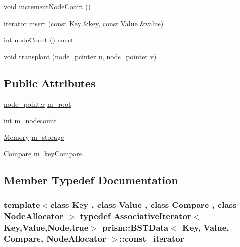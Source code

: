 \begin{DoxyCompactItemize}
void \hyperlink{structprism_1_1_b_s_t_data_a60dc1cbae77145e214a06009babfef4a}{increment\+Node\+Count} ()
\item 
\hyperlink{structprism_1_1_b_s_t_data_a45bbf30d426440d4c346529f898b840c}{iterator} \hyperlink{structprism_1_1_b_s_t_data_a791c56b40962b32cd4df9e30e6b95267}{insert} (const Key \&key, const Value \&value)
\item 
int \hyperlink{structprism_1_1_b_s_t_data_ae212f01cf0e019d0359b28e88d91d2d2}{node\+Count} () const 
\item 
void \hyperlink{structprism_1_1_b_s_t_data_a4f8fa8ab8515c3b77b7bbc02c60aef50}{transplant} (\hyperlink{structprism_1_1_b_s_t_node}{node\+\_\+pointer} u, \hyperlink{structprism_1_1_b_s_t_node}{node\+\_\+pointer} v)
\end{DoxyCompactItemize}
\subsection*{Public Attributes}
\begin{DoxyCompactItemize}
\item 
\hyperlink{structprism_1_1_b_s_t_node}{node\+\_\+pointer} \hyperlink{structprism_1_1_b_s_t_data_afb5f96097c1713e1d86b1c38d831d5fe}{m\+\_\+root}
\item 
int \hyperlink{structprism_1_1_b_s_t_data_a99e476b247ff0230b1ce077634e5b445}{m\+\_\+nodecount}
\item 
\hyperlink{structprism_1_1_b_s_t_memory}{Memory} \hyperlink{structprism_1_1_b_s_t_data_aa6f2a5e9475beddec8574677bb8ee997}{m\+\_\+storage}
\item 
Compare \hyperlink{structprism_1_1_b_s_t_data_a95cbe7359527a366839716a1d173d0a7}{m\+\_\+key\+Compare}
\end{DoxyCompactItemize}


\subsection{Member Typedef Documentation}
\subsubsection[{\texorpdfstring{const\+\_\+iterator}{const_iterator}}]{\setlength{\rightskip}{0pt plus 5cm}template$<$class Key , class Value , class Compare , class Node\+Allocator $>$ typedef {\bf Associative\+Iterator}$<$Key,Value,{\bf Node},true$>$ {\bf prism\+::\+B\+S\+T\+Data}$<$ Key, Value, Compare, Node\+Allocator $>$\+::{\bf const\+\_\+iterator}}\hypertarget{structprism_1_1_b_s_t_data_ae697fd0ffd6d0bbd6744baa8882fb812}{}\label{structprism_1_1_b_s_t_data_ae697fd0ffd6d0bbd6744baa8882fb812}
